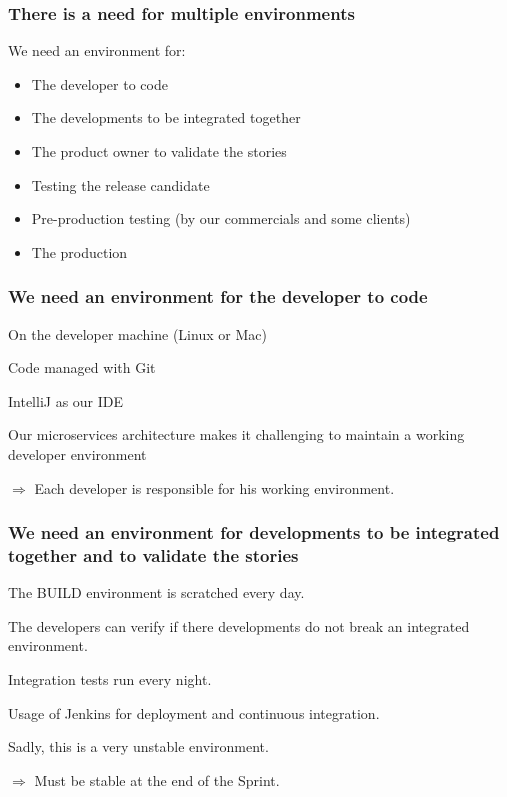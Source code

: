 \documentclass[a4paper, 11pt]{article}
\begin{document}
    \subsubsection{There is a need for multiple environments}

    We need an environment for:

    \begin{itemize}
        \item The developer to code
        \item The developments to be integrated together
        \item The product owner to validate the stories
        \item Testing the release candidate
        \item Pre-production testing (by our commercials and some clients)
        \item The production
    \end{itemize}


    \subsubsection{We need an environment for the developer to code}

    On the developer machine (Linux or Mac)

    Code managed with Git

    IntelliJ as our IDE

    Our microservices architecture makes it challenging to maintain a working
    developer environment

    $\Rightarrow$ Each developer is responsible for his working environment.

    \subsubsection{We need an environment for developments to be integrated together and to validate the stories}

    The BUILD environment is scratched every day.

    The developers can verify if there developments do not break an integrated environment.

    Integration tests run every night.

    Usage of Jenkins for deployment and continuous integration.

    Sadly, this is a very unstable environment.

    $\Rightarrow$ Must be stable at the end of the Sprint.
\end{document}
